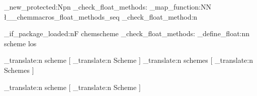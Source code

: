 \cs_new_protected:Npn \chemmacros_check_float_methods:
  {
    \seq_map_function:NN
      \l__chemmacros_float_methods_seq
      \chemmacros_check_float_method:n
  }

\AtEndPreamble
  {
    \chemmacros_if_package_loaded:nF {chemscheme}
      {
        \chemmacros_check_float_methods:
        \chemmacros_define_float:nn {scheme} {los}
      }
  }

  { \chemmacros_translate:n {scheme} }
  [ \chemmacros_translate:n {Scheme} ]
  { \chemmacros_translate:n {schemes} }
  [ \chemmacros_translate:n {Schemes} ]

  { \chemmacros_translate:n {scheme} }
  [ \chemmacros_translate:n {Scheme} ]
\EndChemCompatibility

